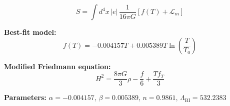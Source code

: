 
\begin{equation}
  S = \int d^4x \, |e| \, \frac{1}{16\pi G} \left[ f(T) + \mathcal{L}_m \right]
\end{equation}

\textbf{Best-fit model:}
\begin{equation}
  f(T) = -0.004157 T + 0.005389 T \ln\!\left(\frac{T}{T_0}\right)
\end{equation}

\textbf{Modified Friedmann equation:}
\begin{equation}
  H^2 = \frac{8\pi G}{3} \rho - \frac{f}{6} + \frac{T f_T}{3}
\end{equation}

\textbf{Parameters:}
$\alpha = -0.004157$, \quad
$\beta = 0.005389$, \quad
$n = 0.9861$, \quad
$\Lambda_{\text{BI}} = 532.2383$